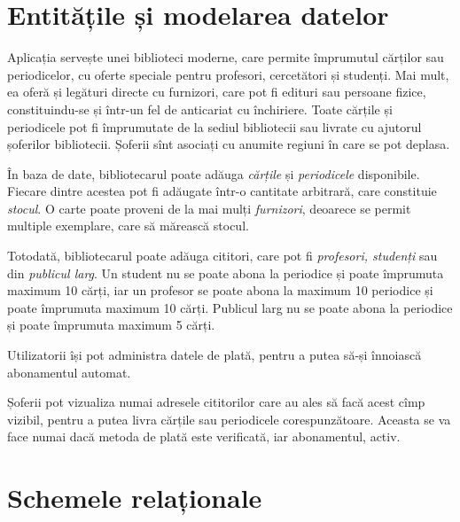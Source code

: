 
\section{Entitățile și modelarea datelor}
\label{sec:ent-model}

Aplicația servește unei biblioteci moderne, care permite împrumutul
cărților sau periodicelor, cu oferte speciale pentru profesori,
cercetători și studenți. Mai mult, ea oferă și legături directe cu
furnizori, care pot fi edituri sau persoane fizice, constituindu-se
și într-un fel de anticariat cu închiriere. Toate cărțile și
periodicele pot fi împrumutate de la sediul bibliotecii sau livrate cu
ajutorul șoferilor bibliotecii. Șoferii sînt asociați cu anumite
regiuni în care se pot deplasa.

În baza de date, bibliotecarul poate adăuga \emph{cărțile} și \emph{periodicele}
disponibile. Fiecare dintre acestea pot fi adăugate într-o cantitate arbitrară,
care constituie \emph{stocul}. O carte poate proveni de la mai mulți
\emph{furnizori}, deoarece se permit multiple exemplare, care să mărească
stocul.

Totodată, bibliotecarul poate adăuga cititori, care pot fi \emph{profesori, %
  studenți} sau din \emph{publicul larg}. Un student nu se poate abona
la periodice și poate împrumuta maximum 10 cărți, iar un profesor se poate
abona la maximum 10 periodice și poate împrumuta maximum 10 cărți.
Publicul larg nu se poate abona la periodice și poate împrumuta maximum
5 cărți.

Utilizatorii își pot administra datele de plată, pentru a putea să-și
înnoiască abonamentul automat.

Șoferii pot vizualiza numai adresele cititorilor care au ales să facă acest
cîmp vizibil, pentru a putea livra cărțile sau periodicele corespunzătoare.
Aceasta se va face numai dacă metoda de plată este verificată, iar abonamentul,
activ.



\section{Schemele relaționale}
\label{sec:scheme-rel}

